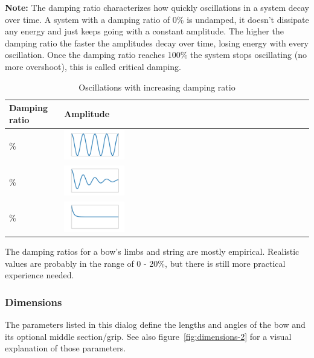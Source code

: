 \documentclass[12pt]{article}
\begin{document}
\textbf{Note:} The damping ratio characterizes how quickly oscillations in a system decay over time.
A system with a damping ratio of 0\% is undamped, it doesn't dissipate any energy and just keeps going with a constant amplitude.
The higher the damping ratio the faster the amplitudes decay over time, losing energy with every oscillation.
Once the damping ratio reaches 100\% the system stops oscillating (no more overshoot), this is called critical damping.

\begin{table}[H]
\centering
\begin{tabular}{| m{4cm} | m{4cm} |}
\hline
\textbf{Damping ratio} & \textbf{Amplitude} \\ \hline
\center 0\% & \includegraphics[width=0.25\textwidth]{figures/damping-ratio-00} \\ \hline
\center 10\% & \includegraphics[width=0.25\textwidth]{figures/damping-ratio-01} \\ \hline
\center 100\% & \includegraphics[width=0.25\textwidth]{figures/damping-ratio-10} \\ \hline
\end{tabular}
\caption{Oscillations with increasing damping ratio}
\label{tbl:damping-ratio}
\end{table}

The damping ratios for a bow's limbs and string are mostly empirical.
Realistic values are probably in the range of 0 - 20\%, but there is still more practical experience needed.

\newpage
\subsubsection{Dimensions}

The parameters listed in this dialog define the lengths and angles of the bow and its optional middle section/grip. See also figure~\ref{fig:dimensions-2} for a visual explanation of those parameters.
\end{document}

